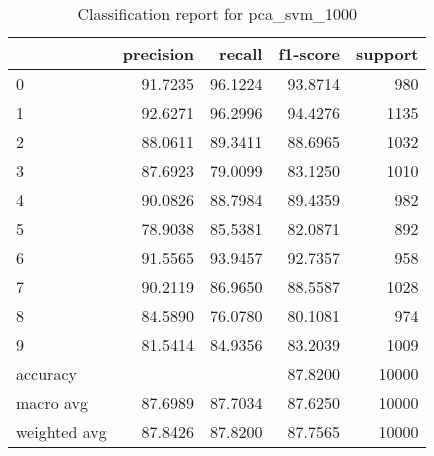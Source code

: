 \begin{table}[htb!]
\centering
\begin{tabular}{lrrrr}
    \toprule
 & precision & recall & f1-score & support \\
\midrule
0 & 91.7235 & 96.1224 & 93.8714 & 980 \\
1 & 92.6271 & 96.2996 & 94.4276 & 1135 \\
2 & 88.0611 & 89.3411 & 88.6965 & 1032 \\
3 & 87.6923 & 79.0099 & 83.1250 & 1010 \\
4 & 90.0826 & 88.7984 & 89.4359 & 982 \\
5 & 78.9038 & 85.5381 & 82.0871 & 892 \\
6 & 91.5565 & 93.9457 & 92.7357 & 958 \\
7 & 90.2119 & 86.9650 & 88.5587 & 1028 \\
8 & 84.5890 & 76.0780 & 80.1081 & 974 \\
9 & 81.5414 & 84.9356 & 83.2039 & 1009 \\
accuracy & & & 87.8200 & 10000 \\
macro avg & 87.6989 & 87.7034 & 87.6250 & 10000 \\
weighted avg & 87.8426 & 87.8200 & 87.7565 & 10000 \\
\bottomrule
\end{tabular}
\caption{Classification report for pca_svm_1000}
\label{tab:classification-report-pca_svm_1000}
\end{table}
